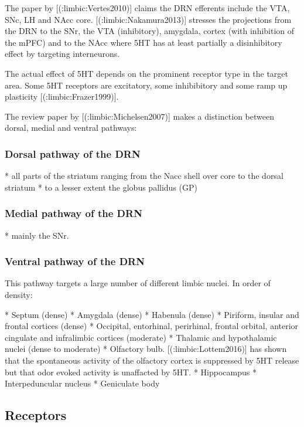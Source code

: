 {{The paper by [(:limbic:Vertes2010)] claims the DRN efferents include the VTA, SNc, LH and NAcc core. [(:limbic:Nakamura2013)] stresses the projections from the DRN to the SNr, the VTA (inhibitory), amygdala, cortex (with inhibition of the mPFC) and to the NAcc where 5HT has at least partially a disinhibitory effect by targeting interneurons.

The actual effect of 5HT depends on the prominent receptor type in the target area. Some 5HT receptors are excitatory, some inhibibitory and some ramp up plasticity [(:limbic:Frazer1999)].

The review paper by [(:limbic:Michelsen2007)] makes a distinction between dorsal, medial and ventral pathways:

\subsubsection{Dorsal pathway of the DRN}

  * all parts of the striatum ranging from the Nacc shell over core to the dorsal striatum
  * to a lesser extent the globus pallidus (GP)

\subsubsection{Medial pathway of the DRN}

  * mainly the SNr.

\subsubsection{Ventral pathway of the DRN}

This pathway targets a large number of different limbic nuclei. In order of density:

  * Septum (dense)
  * Amygdala (dense)
  * Habenula (dense)
  * Piriform, insular and frontal cortices (dense)
  * Occipital, entorhinal, perirhinal, frontal orbital, anterior cingulate and infralimbic cortices (moderate)
  * Thalamic and hypothalamic nuclei (dense to moderate)
  * Olfactory bulb. [(:limbic:Lottem2016)] has shown that the spontaneous activity of the olfactory cortex is suppressed by 5HT release but that odor evoked activity is unaffacted by 5HT.
  * Hippocampus
  * Interpeduncular nucleus
  * Geniculate body


\subsection{Receptors}

}}
